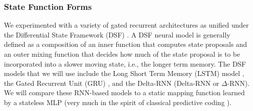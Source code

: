 \documentclass[smallabstract,smallcaptions]{dccpaper}
\begin{document}
\subsubsection{State Function Forms}
\label{state_fun}
We experimented with a variety of gated recurrent architectures as unified under the Differential State Framework (DSF) \cite{ororbia2017diff}. A DSF neural model is generally defined as a composition of an inner function that computes state proposals and an outer mixing function that decides how much of the state proposal is to be incorporated into a slower moving state, i.e., the longer term memory. 
The DSF models that we will use include the Long Short Term Memory (LSTM) model \cite{hochreiter1997long}, the Gated Recurrent Unit (GRU) \cite{chung2014empirical}, and the Delta-RNN (Delta-RNN or $\Delta$-RNN). We will compare these RNN-based models to a static mapping function learned by a stateless MLP (very much in the spirit of classical predictive coding \cite{spratling2017pred}).
\end{document}
